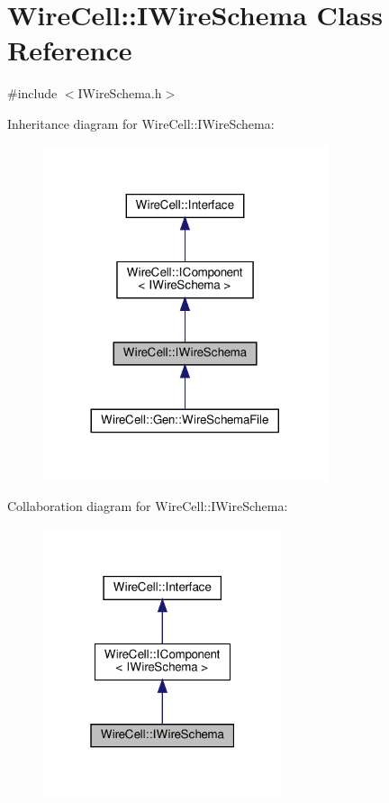 \hypertarget{class_wire_cell_1_1_i_wire_schema}{}\section{Wire\+Cell\+:\+:I\+Wire\+Schema Class Reference}
\label{class_wire_cell_1_1_i_wire_schema}


{\ttfamily \#include $<$I\+Wire\+Schema.\+h$>$}



Inheritance diagram for Wire\+Cell\+:\+:I\+Wire\+Schema\+:
\nopagebreak
\begin{figure}[H]
\begin{center}
\leavevmode
\includegraphics[width=236pt]{class_wire_cell_1_1_i_wire_schema__inherit__graph}
\end{center}
\end{figure}


Collaboration diagram for Wire\+Cell\+:\+:I\+Wire\+Schema\+:
\nopagebreak
\begin{figure}[H]
\begin{center}
\leavevmode
\includegraphics[width=199pt]{class_wire_cell_1_1_i_wire_schema__coll__graph}
\end{center}
\end{figure}
